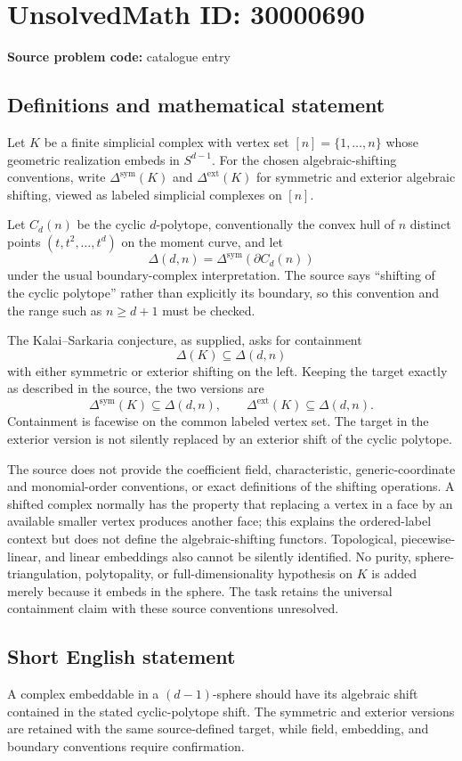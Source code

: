 \documentclass[11pt]{article}
\begin{document}
\section*{UnsolvedMath ID: 30000690}
\textbf{Source problem code:} catalogue entry
\subsection{Definitions and mathematical statement}
Let $K$ be a finite simplicial complex with vertex set $[n]=\{1,\ldots,n\}$ whose geometric realization embeds in $S^{d-1}$. For the chosen algebraic-shifting conventions, write $\Delta^{\mathrm{sym}}(K)$ and $\Delta^{\mathrm{ext}}(K)$ for symmetric and exterior algebraic shifting, viewed as labeled simplicial complexes on $[n]$.

Let $C_d(n)$ be the cyclic $d$-polytope, conventionally the convex hull of $n$ distinct points $(t,t^2,\ldots,t^d)$ on the moment curve, and let
\[
 \Delta(d,n)=\Delta^{\mathrm{sym}}(\partial C_d(n))
\]
under the usual boundary-complex interpretation. The source says ``shifting of the cyclic polytope'' rather than explicitly its boundary, so this convention and the range such as $n\ge d+1$ must be checked.

The Kalai--Sarkaria conjecture, as supplied, asks for containment
\[
 \Delta(K)\subseteq\Delta(d,n)
\]
with either symmetric or exterior shifting on the left. Keeping the target exactly as described in the source, the two versions are
\[
 \Delta^{\mathrm{sym}}(K)\subseteq\Delta(d,n),
 \qquad
 \Delta^{\mathrm{ext}}(K)\subseteq\Delta(d,n).
\]
Containment is facewise on the common labeled vertex set. The target in the exterior version is not silently replaced by an exterior shift of the cyclic polytope.

The source does not provide the coefficient field, characteristic, generic-coordinate and monomial-order conventions, or exact definitions of the shifting operations. A shifted complex normally has the property that replacing a vertex in a face by an available smaller vertex produces another face; this explains the ordered-label context but does not define the algebraic-shifting functors. Topological, piecewise-linear, and linear embeddings also cannot be silently identified. No purity, sphere-triangulation, polytopality, or full-dimensionality hypothesis on $K$ is added merely because it embeds in the sphere. The task retains the universal containment claim with these source conventions unresolved.
\subsection{Short English statement}
A complex embeddable in a $(d-1)$-sphere should have its algebraic shift contained in the stated cyclic-polytope shift. The symmetric and exterior versions are retained with the same source-defined target, while field, embedding, and boundary conventions require confirmation.
\end{document}
